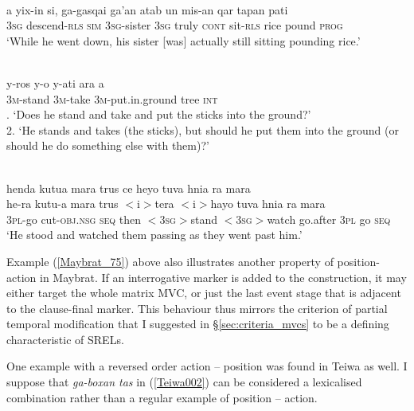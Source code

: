 \ea \label{Teiwa_24}
\\
\gll a yix-in si, ga-gasqai ga'an atab un mis-an qar tapan pati \\
3\textsc{sg} descend-\textsc{rls} \textsc{sim} 3\textsc{sg}-sister 3\textsc{sg} truly \textsc{cont} sit-\textsc{rls} rice pound \textsc{prog} \\
\glft `While he went down, his sister [was] actually still sitting pounding rice.'\\ 
\z

\ea \label{Maybrat_75}
\\
\gll y-ros y-o y-ati ara a \\
3\textsc{m}-stand 3\textsc{m}-take 3\textsc{m}-put.in.ground tree \textsc{int} \\
. `Does he stand and take and put the sticks into the ground?' \\ 2. `He stands and takes (the sticks), but should he put them into the ground (or should he do something else with them)?'\\
\z

\ea \label{WBW016}
\\
\glll henda kutua mara trus ce heyo tuva hnia ra mara \\
he-ra kutu-a mara trus $<$i$>$tera $<$i$>$hayo tuva hnia ra mara \\
\textsc{3}\textsc{pl}-go cut-\textsc{obj}.\textsc{nsg} \textsc{seq} then $<$\textsc{3}\textsc{sg}$>$stand $<$\textsc{3}\textsc{sg}$>$watch go.after \textsc{3}\textsc{pl} go \textsc{seq} \\
\glft `He stood and watched them passing as they went past him.'\\ 
\z

Example (\ref{Maybrat_75}) above also illustrates another property of position-action in Maybrat. If an interrogative marker is added to the construction, it may either target the whole matrix MVC, or just the last event stage that is adjacent to the clause-final marker. This behaviour thus mirrors the criterion of partial temporal modification that I suggested in §\ref{sec:criteria_mvcs} to be a defining characteristic of SRELs.

One example with a reversed order action -- position was found in Teiwa as well. I suppose that \textit{ga-boxan tas} in (\ref{Teiwa002}) can be considered a lexicalised combination rather than a regular example of position -- action.

